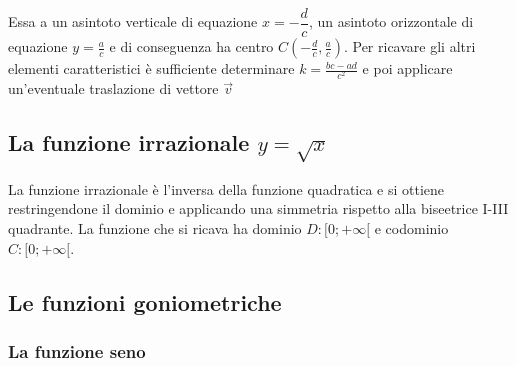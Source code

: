 \documentclass{article}     %
\begin{document}
        Essa a un asintoto verticale di equazione $x=-\dfrac{d}{c}$, un asintoto  orizzontale di equazione $y=\frac{a}{c}$ e di conseguenza ha centro $C(-\frac{d}{c},\frac{a}{c})$. Per ricavare gli altri elementi caratteristici è sufficiente determinare $k=\frac{bc-ad}{c^2}$ e poi applicare un'eventuale traslazione di vettore $\vec{v}$
        \subsection{La funzione irrazionale $y=\sqrt{x}$}
        La funzione irrazionale è l'inversa della funzione quadratica e si ottiene restringendone il dominio e applicando una simmetria rispetto alla biseetrice I-III quadrante. La funzione che si ricava ha dominio $D:[0;+\infty[$ e codominio $C:[0;+\infty[$.
    \subsection{Le funzioni goniometriche}
    \subsubsection{La funzione seno}
    
\end{document}
